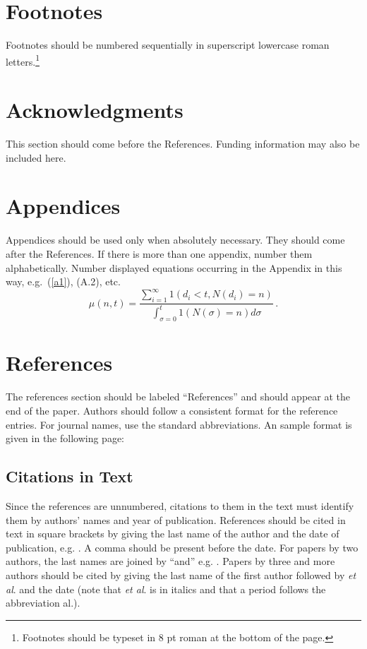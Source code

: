 \documentclass{ws-ijcm}
\begin{document}
\section{Footnotes}
Footnotes should be numbered sequentially in superscript lowercase
roman letters.\footnote{Footnotes should be typeset in 8 pt roman at
the bottom of the page.}

\section*{Acknowledgments}
This section should come before the References. Funding information
may also be included here.

\appendix

\section{Appendices}

Appendices should be used only when absolutely necessary. They should
come after the References. If there is more than one appendix, number
them alphabetically. Number displayed equations occurring in the
Appendix in this way, e.g.~(\ref{a1}), (A.2), etc.
\begin{equation}
\mu(n, t) = \frac{\sum^\infty_{i=1} 1(d_i < t, 
N(d_i) = n)}{\int^t_{\sigma=0} 1(N(\sigma) = n)d\sigma}\,.
\label{a1}
\end{equation}

\section*{References}
The references section should be labeled ``References'' and should appear
at the end of the paper. Authors should follow a consistent format
for the reference entries. For journal names, use the standard abbreviations.
An sample format is given in the following page:

\subsection*{Citations in Text}
Since the references are unnumbered, citations to them in the text
must identify them by authors' names and year of
publication. References should be cited in text in square brackets by
giving the last name of the author and the date of publication,
e.g. \cite{wong89}. A comma should be present before the date.  For
papers by two authors, the last names are joined by ``and''
e.g. \cite{hussaini}. Papers by three and more authors should be cited 
by  giving the last name of the first author followed by {\it et al}. 
and the date (note that {\it et al}. is in italics and that a period
follows the abbreviation al.).
\end{document}
